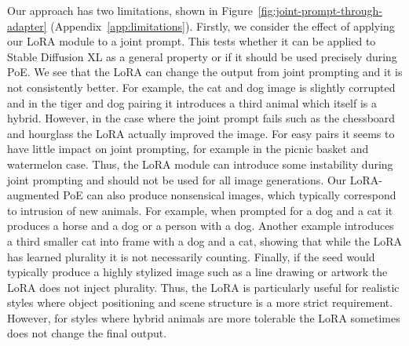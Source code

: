 \documentclass{article} %
\begin{document}
Our approach has two limitations, shown in Figure~\ref{fig:joint-prompt-through-adapter} (Appendix~\ref{app:limitations}). Firstly, we consider the effect of applying our LoRA module to a joint prompt. This tests whether it can be applied to Stable Diffusion XL as a general property or if it should be used precisely during PoE. We see that the LoRA can change the output from joint prompting and it is not consistently better. For example, the cat and dog image is slightly corrupted and in the tiger and dog pairing it introduces a third animal which itself is a hybrid. However, in the case where the joint prompt fails such as the chessboard and hourglass the LoRA actually improved the image. For easy pairs it seems to have little impact on joint prompting, for example in the picnic basket and watermelon case. Thus, the LoRA module can introduce some instability during joint prompting and should not be used for all image generations. Our LoRA-augmented PoE can also produce nonsensical images, which typically correspond to intrusion of new animals. For example, when prompted for a dog and a cat it produces a horse and a dog or a person with a dog. Another example introduces a third smaller cat into frame with a dog and a cat, showing that while the LoRA has learned plurality it is not necessarily counting. Finally, if the seed would typically produce a highly stylized image such as a line drawing or artwork the LoRA does not inject plurality. Thus, the LoRA is particularly useful for realistic styles where object positioning and scene structure is a more strict requirement. However, for styles where hybrid animals are more tolerable the LoRA sometimes does not change the final output.


\end{document}
